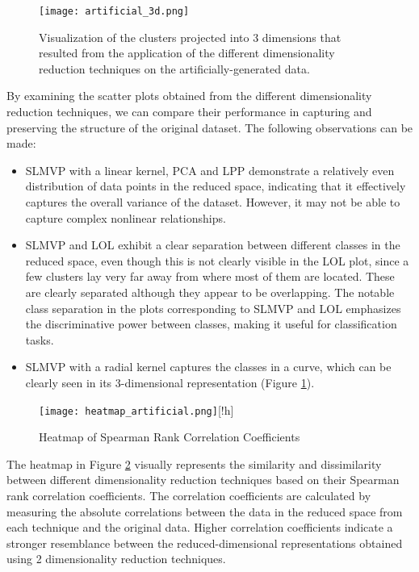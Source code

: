 \begin{figure}[!h]
    \centering
    \texttt{[image: artificial\_3d.png]}
    \caption{Visualization of the clusters projected into 3 dimensions that resulted from the application of the different dimensionality reduction techniques on the artificially-generated data.}
    \label{fig:artificial_3d}
\end{figure}

By examining the scatter plots obtained from the different dimensionality reduction techniques, we can compare their performance in capturing and preserving the structure of the original dataset. The following observations can be made:

\begin{itemize}
    \item SLMVP with a linear kernel, PCA and LPP demonstrate a relatively even distribution of data points in the reduced space, indicating that it effectively captures the overall variance of the dataset. However, it may not be able to capture complex nonlinear relationships.
    \item SLMVP and LOL exhibit a clear separation between different classes in the reduced space, even though this is not clearly visible in the LOL plot, since a few clusters lay very far away from where most of them are located. These are clearly separated although they appear to be overlapping. The notable class separation in the plots corresponding to SLMVP and LOL emphasizes the discriminative power between classes, making it useful for classification tasks.
    \item SLMVP with a radial kernel captures the classes in a curve, which can be clearly seen in its 3-dimensional representation (Figure \ref{fig:artificial_3d}).
\end{itemize}

\begin{center}
    \begin{figure}
        \centering
        \texttt{[image: heatmap\_artificial.png]}[!h]
        \caption{Heatmap of Spearman Rank Correlation Coefficients}
        \label{fig:heatmap-artificial}
    \end{figure}
\end{center}

The heatmap in Figure \ref{fig:heatmap-artificial} visually represents the similarity and dissimilarity between different dimensionality reduction techniques based on their Spearman rank correlation coefficients. The correlation coefficients are calculated by measuring the absolute correlations between the data in the reduced space from each technique and the original data. Higher correlation coefficients indicate a stronger resemblance between the reduced-dimensional representations obtained using 2 dimensionality reduction techniques.

